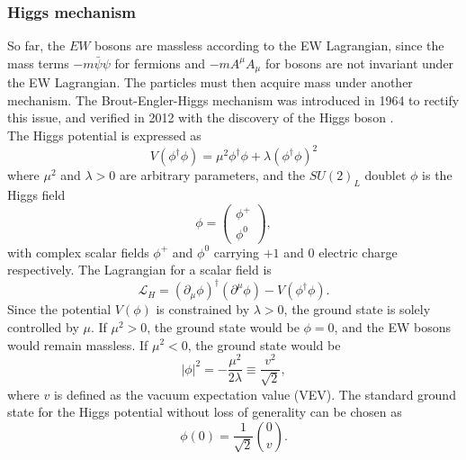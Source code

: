 \documentclass[../thesis.tex]{subfiles}
\begin{document}
\subsubsection*{Higgs mechanism}
So far, the $EW$ bosons are massless according to the \acs{EW} Lagrangian, since the mass terms $-m\bar{\psi}\psi$ for fermions and $-mA^\mu A_\mu$ for bosons are not invariant under the \acs{EW} Lagrangian. The particles must then acquire mass under another mechanism. The Brout-Engler-Higgs mechanism \citep{theory:higgs1,theory:higgs2,theory:brout_englert} was introduced in 1964 to rectify this issue, and verified in 2012 with the discovery of the Higgs boson \citep{theory:higgs_atlas,theory:higgs_cms}.\\
The Higgs potential is expressed as
\begin{equation}
V(\phi^\dagger\phi) = \mu^2\phi^\dagger\phi+\lambda(\phi^\dagger\phi)^2
\end{equation}
where $\mu^2$ and $\lambda>0$ are arbitrary parameters, and the $SU(2)_L$ doublet $\phi$ is the Higgs field
\begin{equation}
\phi = 
\begin{pmatrix}
\phi^+ \\ \phi^0
\end{pmatrix},
\end{equation}
with complex scalar fields $\phi^+$ and $\phi^0$ carrying $+1$ and $0$ electric charge respectively. The Lagrangian for a scalar field is
\begin{equation}
\mathcal{L}_H = \left(\partial_\mu \phi\right)^\dagger \left(\partial^\mu \phi\right) - V\left(\phi^\dagger\phi\right).
\end{equation}
Since the potential $V(\phi)$ is constrained by $\lambda>0$, the ground state is solely controlled by $\mu$. If $\mu^2>0$, the ground state would be $\phi=0$, and the \acs{EW} bosons would remain massless. If $\mu^2<0$, the ground state would be
\begin{equation}
|\phi|^2 = -\displaystyle\frac{\mu^2}{2\lambda} \equiv \displaystyle\frac{v^2}{\sqrt{2}},
\end{equation}
where $v$ is defined as the vacuum expectation value (\acs{VEV}). The standard ground state for the Higgs potential without loss of generality can be chosen as
\begin{equation}
\phi(0) = \frac{1}{\sqrt{2}}
\binom{0}{v}.
\end{equation}
\end{document}
